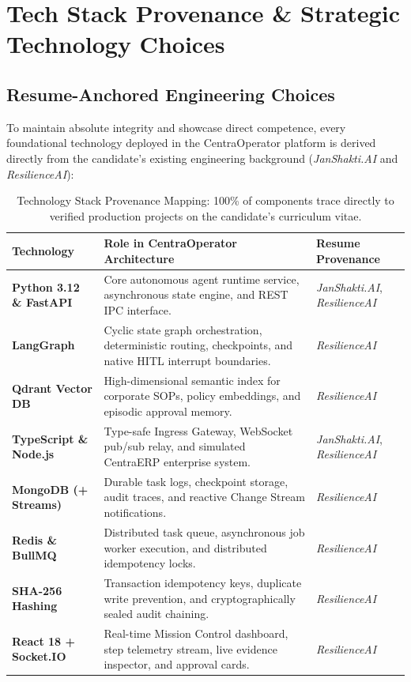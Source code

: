 \section{Tech Stack Provenance \& Strategic Technology Choices}
\label{sec:tech_stack}

\subsection{Resume-Anchored Engineering Choices}
To maintain absolute integrity and showcase direct competence, every foundational technology deployed in the CentraOperator platform is derived directly from the candidate's existing engineering background (\textit{JanShakti.AI} and \textit{ResilienceAI}):

\begin{table}[htbp]
  \centering
  \small
  \begin{tabularx}{\textwidth}{l p{7.5cm} l}
    \toprule
    \textbf{Technology} & \textbf{Role in CentraOperator Architecture} & \textbf{Resume Provenance} \\
    \midrule
    \textbf{Python 3.12 \& FastAPI} & Core autonomous agent runtime service, asynchronous state engine, and REST IPC interface. & \textit{JanShakti.AI}, \textit{ResilienceAI} \\
    \addlinespace
    \textbf{LangGraph} & Cyclic state graph orchestration, deterministic routing, checkpoints, and native HITL interrupt boundaries. & \textit{ResilienceAI} \\
    \addlinespace
    \textbf{Qdrant Vector DB} & High-dimensional semantic index for corporate SOPs, policy embeddings, and episodic approval memory. & \textit{ResilienceAI} \\
    \addlinespace
    \textbf{TypeScript \& Node.js} & Type-safe Ingress Gateway, WebSocket pub/sub relay, and simulated CentraERP enterprise system. & \textit{JanShakti.AI}, \textit{ResilienceAI} \\
    \addlinespace
    \textbf{MongoDB (+ Streams)} & Durable task logs, checkpoint storage, audit traces, and reactive Change Stream notifications. & \textit{ResilienceAI} \\
    \addlinespace
    \textbf{Redis \& BullMQ} & Distributed task queue, asynchronous job worker execution, and distributed idempotency locks. & \textit{ResilienceAI} \\
    \addlinespace
    \textbf{SHA-256 Hashing} & Transaction idempotency keys, duplicate write prevention, and cryptographically sealed audit chaining. & \textit{ResilienceAI} \\
    \addlinespace
    \textbf{React 18 + Socket.IO} & Real-time Mission Control dashboard, step telemetry stream, live evidence inspector, and approval cards. & \textit{ResilienceAI} \\
    \bottomrule
  \end{tabularx}
  \caption{Technology Stack Provenance Mapping: 100\% of components trace directly to verified production projects on the candidate's curriculum vitae.}
  \label{tab:stack_provenance}
\end{table}

